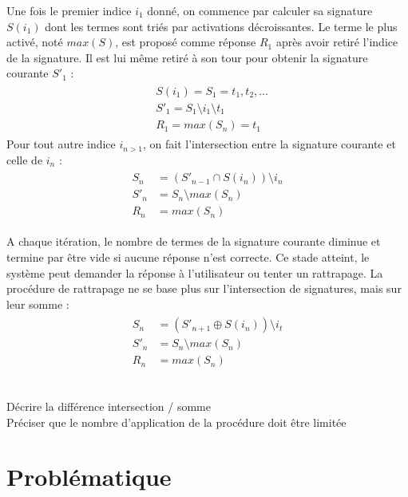 Une fois le premier indice $i_{1}$ donné, on commence par calculer sa
signature $S(i_{1})$ dont les termes sont triés par activations décroissantes.
Le terme le plus activé, noté $max(S)$, est proposé comme réponse $R_{1}$
après avoir retiré l'indice de la signature.
Il est lui même retiré à son tour pour obtenir la signature courante $S'_{1}$ :
\begin{align}
	\begin{split}
		&S(i_{1}) = S_{1} = t_{1}, t_{2}, \dots \\
		&S'_{1} = S_{1} \setminus i_{1} \setminus t_{1} \\
		&R_{1} = max(S_{n}) = t_{1}
	\end{split}
	\label{eq:al1}
\end{align}
Pour tout autre indice $i_{n>1}$, on fait l'intersection entre la signature
courante et celle de $i_{n}$ :
\begin{align}
	\begin{split}
		S_{n} &= (S'_{n-1} \cap S(i_{n})) \setminus i_{n} \\
		S'_{n} &= S_{n} \setminus max(S_{n}) \\
		R_{n} &= max(S_{n})
	\end{split}
	\label{eq:al2}
\end{align}

A chaque itération, le nombre de termes de la signature courante diminue et
termine par être vide si aucune réponse n'est correcte.
Ce stade atteint, le système peut demander la réponse à l'utilisateur ou 
tenter un rattrapage.
La procédure de rattrapage ne se base plus sur l'intersection de signatures,
mais sur leur somme :
\begin{align}
	\begin{split}
		S_{n} &= (S'_{n+1} \oplus S(i_{n})) \setminus i_t \\
		S'_{n} &= S_{n} \setminus max(S_{n}) \\
		R_{n} &= max(S_{n})
	\end{split}
\end{align}

\begin{todo} ~\\
	Décrire la différence intersection / somme \\
	Préciser que le nombre d'application de la procédure doit être limitée
\end{todo}

\section{Problématique}

\begin{todo}

\end{todo}

